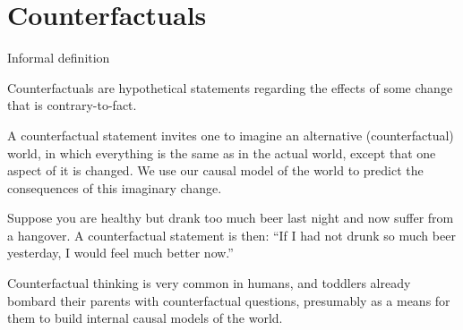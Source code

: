 
\part{Counterfactuals}
\frame{\partpage}

\begin{frame}{Informal definition}
  \begin{definition}[Informal]
Counterfactuals are hypothetical statements regarding the effects of some change that is contrary-to-fact.
  \end{definition}

  A counterfactual statement invites one to imagine an alternative (counterfactual) world, in which 
  everything is the same as in the actual world, except that one aspect of it is changed.
  We use our causal model of the world to predict the consequences of this imaginary change.

  \begin{example}
  Suppose you are healthy but drank too much beer last night and now suffer from a hangover. 
  A counterfactual statement is then: ``If I had not drunk so much beer yesterday, I would feel much better now.''
  \end{example}

  Counterfactual thinking is very common in humans, and toddlers already bombard
  their parents with counterfactual questions, presumably as a means for them
  to build internal causal models of the world.
\end{frame}

